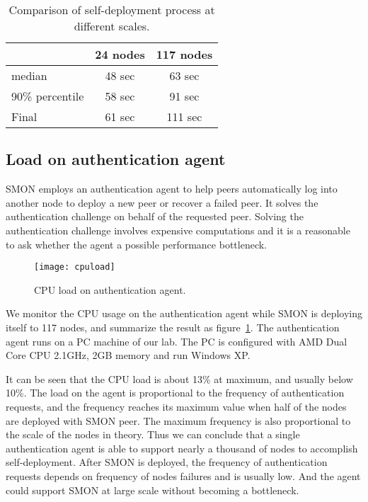 \begin{table}[h]
\centering
\begin{tabular}{|l|c|c|}
\hline
  & 24 nodes & 117 nodes\\
\hline
median & 48 sec & 63 sec \\
\hline
90\% percentile & 58 sec & 91 sec\\
\hline
Final & 61 sec & 111 sec\\
\hline
\end{tabular}
\caption{Comparison of self-deployment process at different
scales.}
\label{tbl:scalability}
\end{table}

\subsection{Load on authentication agent}

SMON employs an authentication agent to help peers
automatically log into another node to deploy a new peer or
recover a failed peer. It solves the authentication
challenge on behalf of the requested peer. Solving the
authentication challenge involves expensive computations and
it is a reasonable to ask whether the agent a possible
performance bottleneck.

\begin{figure}[h]
\centering
\texttt{[image: cpuload]}
\caption{CPU load on authentication agent.}
\label{fig:agentload}
\end{figure}

We monitor the CPU usage on the authentication agent while
SMON is deploying itself to 117 nodes, and summarize the
result as figure~\ref{fig:agentload}. The authentication
agent runs on a PC machine of our lab. The PC is configured
with AMD Dual Core CPU 2.1GHz, 2GB memory and run Windows
XP.

It can be seen that the CPU load is about 13\% at maximum,
and usually below 10\%.  The load on the agent is
proportional to the frequency of authentication requests,
and the frequency reaches its maximum value when half of the
nodes are deployed with SMON peer. The maximum frequency is
also proportional to the scale of the nodes in theory. Thus
we can conclude that a single authentication agent is able
to support nearly a thousand of nodes to accomplish
self-deployment. After SMON is deployed, the frequency of
authentication requests depends on frequency of nodes
failures and is usually low.  And the agent could support
SMON at large scale without becoming a bottleneck.

